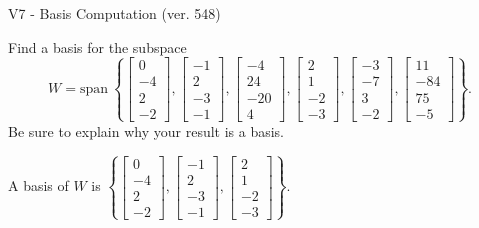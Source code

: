 \begin{exercise}
  \begin{exerciseTitle}V7 - Basis Computation (ver. 548)\end{exerciseTitle}
  \begin{exerciseStatement}
    Find a basis for the subspace 
\[W=\mathrm{span}\ \left\{\left[\begin{array}{r}
0 \\
-4 \\
2 \\
-2
\end{array}\right] , \left[\begin{array}{r}
-1 \\
2 \\
-3 \\
-1
\end{array}\right] , \left[\begin{array}{r}
-4 \\
24 \\
-20 \\
4
\end{array}\right] , \left[\begin{array}{r}
2 \\
1 \\
-2 \\
-3
\end{array}\right] , \left[\begin{array}{r}
-3 \\
-7 \\
3 \\
-2
\end{array}\right] , \left[\begin{array}{r}
11 \\
-84 \\
75 \\
-5
\end{array}\right]\right\}.\]
 Be sure to explain why your result is a basis.


  \end{exerciseStatement}
  \begin{exerciseAnswer}
   A basis of \(W\) is  \(\left\{\left[\begin{array}{r}
0 \\
-4 \\
2 \\
-2
\end{array}\right] , \left[\begin{array}{r}
-1 \\
2 \\
-3 \\
-1
\end{array}\right] , \left[\begin{array}{r}
2 \\
1 \\
-2 \\
-3
\end{array}\right]\right\}\).
  


  \end{exerciseAnswer}
\end{exercise}